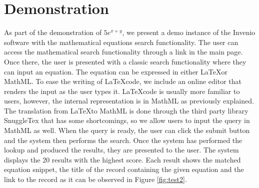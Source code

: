 \documentclass{sig-alternate}
\begin{document}
\section{Demonstration}
As part of the demonstration of $5e^{x+y}$, we present a demo instance of the Invenio software with the mathematical equations search functionality.
The user can access the mathematical search functionality through a link in the main page. Once there, the user is presented with a classic search functionality where they can input an equation. The equation can be expressed in either \LaTeX  or MathML. To ease the writing of \LaTeX  code, we include an online editor\cite{latex_editor} that renders the input as the user types it. \LaTeX  code is usually more familiar to users, however, the internal representation is in MathML as previously explained. The translation from \LaTeX  to MathML is done through the third party library SnuggleTex\cite{snuggletex} that has some shortcomings, so we allow users to input the query in MathML as well. When the query is ready, the user can click the submit button and the system then performs the search. Once the system has performed the lookup and produced the results, they are presented to the user. The system displays the 20 results with the highest score. Each result shows the matched equation snippet, the title of the record containing the given equation and the link to the record as it can be observed in Figure \ref{fig:test2}.

%

\end{document}
